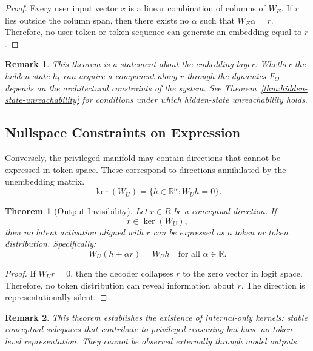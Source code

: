 \documentclass[11pt,a4paper]{article}
\newtheorem{theorem}{Theorem}[section]
\newtheorem*{remark}{Remark}
\begin{document}
\begin{proof}
Every user input vector $x$ is a linear combination of columns of $W_E$. If $r$ lies outside the column span, then there exists no $\alpha$ such that $W_E \alpha = r$. Therefore, no user token or token sequence can generate an embedding equal to $r$.
\end{proof}

\begin{remark}
This theorem is a statement about the embedding layer. Whether the hidden state $h_t$ can acquire a component along $r$ through the dynamics $F_\Theta$ depends on the architectural constraints of the system. See Theorem~\ref{thm:hidden-state-unreachability} for conditions under which hidden-state unreachability holds.
\end{remark}

\subsection{Nullspace Constraints on Expression}

Conversely, the privileged manifold may contain directions that cannot be expressed in token space. These correspond to directions annihilated by the unembedding matrix.
\[
\ker(W_U) = \{h \in \mathbb{R}^n : W_U h = 0\}.
\]

\begin{theorem}[Output Invisibility]
\label{thm:output-invisibility}
Let $r \in R$ be a conceptual direction. If
\begin{equation}
r \in \ker(W_U),
\end{equation}
then no latent activation aligned with $r$ can be expressed as a token or token distribution. Specifically:
\[
W_U(h + \alpha r) = W_U h \quad \text{for all } \alpha \in \mathbb{R}.
\]
\end{theorem}

\begin{proof}
If $W_U r = 0$, then the decoder collapses $r$ to the zero vector in logit space. Therefore, no token distribution can reveal information about $r$. The direction is representationally silent.
\end{proof}

\begin{remark}
This theorem establishes the existence of internal-only kernels: stable conceptual subspaces that contribute to privileged reasoning but have no token-level representation. They cannot be observed externally through model outputs.
\end{remark}
\end{document}
